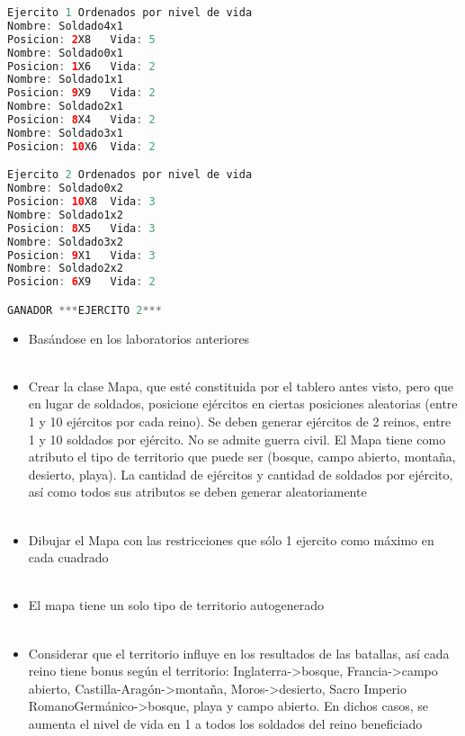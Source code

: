 \documentclass{article}
\begin{document}
\begin{itemize}
\begin{itemize}
\begin{lstlisting}[language=java]
Ejercito 1 Ordenados por nivel de vida
Nombre: Soldado4x1
Posicion: 2X8   Vida: 5
Nombre: Soldado0x1
Posicion: 1X6   Vida: 2
Nombre: Soldado1x1
Posicion: 9X9   Vida: 2
Nombre: Soldado2x1
Posicion: 8X4   Vida: 2
Nombre: Soldado3x1
Posicion: 10X6  Vida: 2

Ejercito 2 Ordenados por nivel de vida
Nombre: Soldado0x2
Posicion: 10X8  Vida: 3
Nombre: Soldado1x2
Posicion: 8X5   Vida: 3
Nombre: Soldado3x2
Posicion: 9X1   Vida: 3
Nombre: Soldado2x2
Posicion: 6X9   Vida: 2

GANADOR ***EJERCITO 2***
        \end{lstlisting}

    
	\end{itemize}
	\begin{itemize}
        \textcolor{red}{PROBLEMA 02}
        \\
        \\
        \item Basándose en los laboratorios anteriores
        \\
        \\
        \item Crear la clase Mapa, que esté constituida por el tablero antes visto, pero que en lugar de soldados, posicione ejércitos en ciertas posiciones aleatorias (entre 1 y 10 ejércitos por cada reino). Se deben generar ejércitos de 2 reinos, entre 1 y 10 soldados por ejército. No se admite guerra civil. El Mapa tiene como atributo el tipo de territorio que puede ser (bosque, campo abierto, montaña, desierto, playa). La cantidad de ejércitos y cantidad de soldados por ejército, así como todos sus atributos se deben generar aleatoriamente
        \\
        \\
        \item Dibujar el Mapa con las restricciones que sólo 1 ejercito como máximo en cada cuadrado
        \\
        \\
        \item El mapa tiene un solo tipo de territorio autogenerado
        \\
        \\
        \item Considerar que el territorio influye en los resultados de las batallas, así cada reino tiene bonus según el territorio: Inglaterra->bosque, Francia->campo abierto, Castilla-Aragón->montaña, Moros->desierto, Sacro Imperio RomanoGermánico->bosque, playa y campo abierto. En dichos casos, se aumenta el nivel de vida en 1 a todos los soldados del reino beneficiado

\end{itemize}
\end{itemize}
\end{document}
